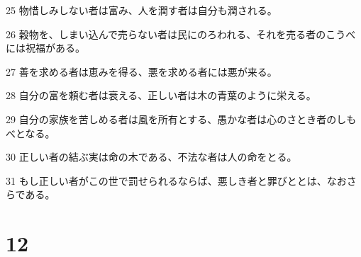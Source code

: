 \par 25 物惜しみしない者は富み、人を潤す者は自分も潤される。
\par 26 穀物を、しまい込んで売らない者は民にのろわれる、それを売る者のこうべには祝福がある。
\par 27 善を求める者は恵みを得る、悪を求める者には悪が来る。
\par 28 自分の富を頼む者は衰える、正しい者は木の青葉のように栄える。
\par 29 自分の家族を苦しめる者は風を所有とする、愚かな者は心のさとき者のしもべとなる。
\par 30 正しい者の結ぶ実は命の木である、不法な者は人の命をとる。
\par 31 もし正しい者がこの世で罰せられるならば、悪しき者と罪びととは、なおさらである。

\chapter{12}

